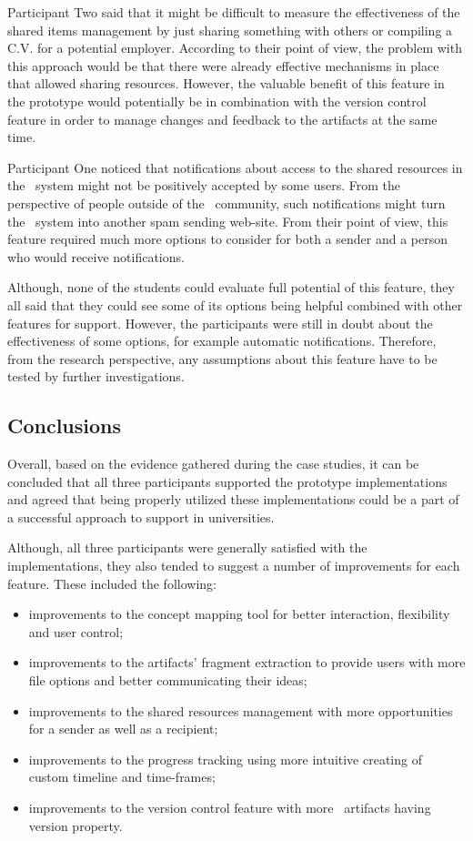 Participant Two said that it might be difficult to measure the effectiveness
of the shared items management by just sharing something with others or
compiling a C.V. for a potential employer. According to their point of view, the
problem with this approach would be that there were already effective mechanisms
in place that allowed sharing resources. However, the valuable benefit of this
feature in the prototype would potentially be in combination with the version
control feature in order to manage changes and feedback to the artifacts at the
same time.

Participant One noticed that notifications about access to the shared resources
in the \ep~system might not be positively accepted by some users. From the
perspective of people outside of the \ep~community, such notifications might
turn the \ep~system into another spam sending web-site. From their point of
view, this feature required much more options to consider for both a sender and
a person who would receive notifications.

Although, none of the students could evaluate full potential of this feature,
they all said that they could see some of its options being helpful combined
with other features for \LLLs support. However, the participants were still in
doubt about the effectiveness of some options, for example automatic
notifications. Therefore, from the research perspective, any assumptions about
this feature have to be tested by further investigations.

\subsection{Conclusions}

Overall, based on the evidence gathered during the case studies, it can be
concluded that all three participants supported the prototype implementations
and agreed that being properly utilized these implementations could be a part of
a successful approach to \LLLs support in universities.

Although, all three participants were generally satisfied with the
implementations, they also tended to suggest a number of improvements for each
feature. These included the following:

\begin{itemize}
  \item improvements to the concept mapping tool for better interaction,
  flexibility and user control;
  \item improvements to the artifacts' fragment extraction to provide users with
  more file options and better communicating their ideas;
  \item improvements to the shared resources management with more opportunities
  for a sender as well as a recipient; 
  \item improvements to the progress tracking using more intuitive creating of
  custom timeline and time-frames;
  \item improvements to the version control feature with more \ep~artifacts
  having version property.
\end{itemize}

